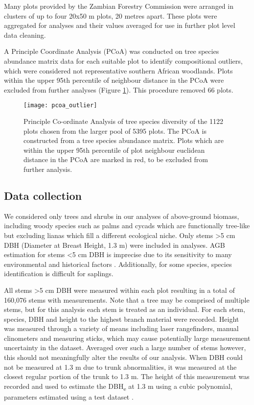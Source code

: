 \documentclass[11pt,a4paper]{article}
\begin{document}
Many plots provided by the Zambian Forestry Commission were arranged in clusters of up to four 20x50 m plots, 20 metres apart. These plots were aggregated for analyses and their values averaged for use in further plot level data cleaning.

A Principle Coordinate Analysis (PCoA) was conducted on tree species abundance matrix data for each suitable plot to identify compositional outliers, which were considered not representative southern African woodlands. Plots within the upper 95th percentile of neighbour distance in the PCoA were excluded from further analyses (Figure \ref{pcoa_outlier}). This procedure removed 66 plots.

\begin{figure}[H]
\centering
	\texttt{[image: pcoa\_outlier]}
	\caption{Principle Co-ordinate Analysis of tree species diversity of the 1122 plots chosen from the larger pool of 5395 plots. The PCoA is constructed from a tree species abundance matrix. Plots which are within the upper 95th percentile of plot neighbour euclidean distance in the PCoA are marked in red, to be excluded from further analysis.}
	\label{pcoa_outlier}
\end{figure}

\subsection{Data collection}

We considered only trees and shrubs in our analyses of above-ground biomass, including woody species such as palms and cycads which are functionally tree-like but excluding lianas which fill a different ecological niche. Only stems \textgreater{}5 cm DBH (Diameter at Breast Height, 1.3 m) were included in analyses. AGB estimation for stems \textless{}5 cm DBH is imprecise due to its sensitivity to many environmental and historical factors \citep{}. Additionally, for some species, species identification is difficult for saplings.

All stems \textgreater{}5 cm DBH were measured within each plot resulting in a total of 160,076 stems with measurements. Note that a tree may be comprised of multiple stems, but for this analysis each stem is treated as an individual. For each stem, species, DBH and height to the highest branch material were recorded. Height was measured through a variety of means including laser rangefinders, manual clinometers and measuring sticks, which may cause potentially large measurement uncertainty in the dataset. Averaged over such a large number of stems however, this should not meaningfully alter the results of our analysis. When DBH could not be measured at 1.3 m due to trunk abnormalities, it was measured at the closest regular portion of the trunk to 1.3 m. The height of this measurement was recorded and used to estimate the DBH\textsubscript{e} at 1.3 m using a cubic polynomial, parameters estimated using a test dataset \citep{Ryanunbublished}.
\end{document}
